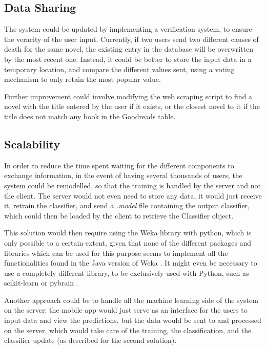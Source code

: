 \documentclass{mproj}
\begin{document}
\subsection*{Data Sharing}

The system could be updated by implementing a verification system, to ensure the veracity of the user input. Currently, if two users send two different causes of death for the same novel, the existing entry in the database will be overwritten by the most recent one. Instead, it could be better to store the input data in a temporary location, and compare the different values sent, using a voting mechanism to only retain the most popular value.

Further improvement could involve modifying the web scraping script to find a novel with the title entered by the user if it exists, or the closest novel to it if the title does not match any book in the Goodreads table.

\subsection*{Scalability}

In order to reduce the time spent waiting for the different components to exchange information, in the event of having several thousands of users, the system could be remodelled, so that the training is handled by the server and not the client. The server would not even need to store any data, it would just receive it, retrain the classifier, and send a \textit{.model} file containing the output classifier, which could then be loaded by the client to retrieve the Classifier object. \par

This solution would then require using the Weka library with python, which is only possible to a certain extent, given that none of the different packages and libraries which can be used for this purpose seems to implement all the functionalities found in the Java version of Weka \cite{wekapython}. It might even be necessary to use a completely different library, to be exclusively used with Python, such as scikit-learn \cite{scikit-learn} or pybrain \cite{pybrain}. \par

Another approach could be to handle all the machine learning side of the system on the server: the mobile app would just serve as an interface for the users to input data and view the predictions, but the data would be sent to and processed on the server, which would take care of the training, the classification, and the classifier update (as described for the second solution). \par
\end{document}
